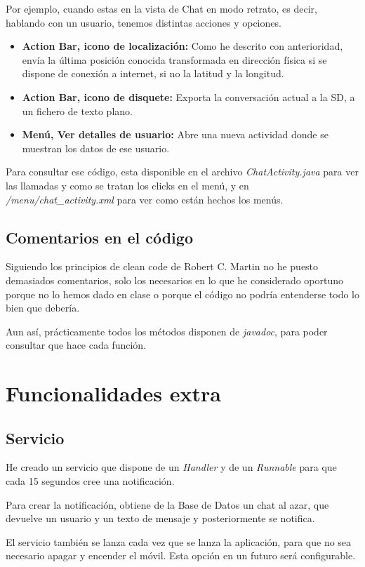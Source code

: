 \documentclass{article}
\begin{document}
Por ejemplo, cuando estas en la vista de Chat en modo retrato, es decir, hablando con un
usuario, tenemos distintas acciones y opciones.

\begin{itemize}
	\item \textbf{Action Bar, icono de localizaci\'on:} Como he descrito con anterioridad,
	env\'ia la \'ultima posici\'on conocida transformada en direcci\'on f\'isica si se
	dispone de conexi\'on a internet, si no la latitud y la longitud.
	\item \textbf{Action Bar, icono de disquete:} Exporta la conversaci\'on actual a la SD, a un 
	fichero de texto plano.
	\item \textbf{Men\'u, Ver detalles de usuario:} Abre una nueva actividad donde se muestran
	los datos de ese usuario.
\end{itemize}

Para consultar ese c\'odigo, esta disponible en el archivo \emph{ChatActivity.java} para ver
las llamadas y como se tratan los clicks en el men\'u, y en \emph{/menu/chat\_activity.xml}
para ver como est\'an hechos los men\'us.

\subsection{Comentarios en el c\'odigo}
Siguiendo los principios de clean code de Robert C. Martin no he puesto
demasiados comentarios, solo los necesarios en lo que he considerado oportuno porque no 
lo hemos dado en clase o porque el c\'odigo no podr\'ia entenderse todo lo bien que deber\'ia.

Aun as\'i, pr\'acticamente todos los m\'etodos disponen de \emph{javadoc}, para poder
consultar que hace cada funci\'on.

\section{Funcionalidades extra}
\subsection{Servicio}
He creado un servicio que dispone de un \emph{Handler} y de un \emph{Runnable} para que
cada 15 segundos cree una notificaci\'on.

Para crear la notificaci\'on, obtiene de la Base de Datos un chat al azar, que devuelve un
usuario y un texto de mensaje y posteriormente se notifica.

El servicio tambi\'en se lanza cada vez que se lanza la aplicaci\'on, para que no sea
necesario apagar y encender el m\'ovil. Esta opci\'on en un futuro ser\'a configurable.
\end{document}
